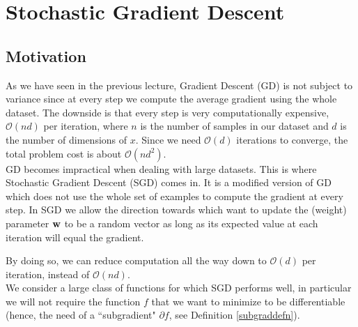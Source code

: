 \documentclass{article}
\begin{document}



\section{Stochastic Gradient Descent}

\subsection{Motivation}

As we have seen in the previous lecture, Gradient Descent (GD) is not subject to variance since at every step we compute the average gradient using the whole dataset. The downside is that every step is very computationally expensive, $\mathcal O(nd)$ per iteration, where $n$ is the number of samples in our dataset and $d$ is the number of dimensions of $x$. Since we need $\mathcal O(d)$ iterations to converge, the total problem cost is about $\mathcal O(nd^2)$.\\

GD becomes impractical when dealing with large datasets. This is where Stochastic Gradient Descent (SGD) comes in. It is a modified version of GD which does not use the whole set of examples to compute the gradient at every step. 
In SGD we allow the direction towards which want to update the (weight) parameter ${\bf w}$ to be a random vector as long as its expected value at each iteration will equal the gradient.%

By doing so, we can reduce computation all the way down to $\mathcal O(d)$ per iteration, instead of $\mathcal O(nd)$. \\



We consider a large class of functions for which SGD performs well, in particular we will not require the function $f$ that we want to minimize to be differentiable (hence, the need of a ``subgradient" $\partial f$, see Definition \ref{subgraddefn}). 
\end{document}
